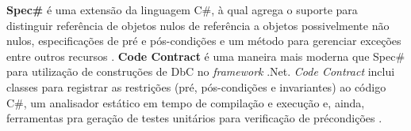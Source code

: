 \textbf{Spec\#} é uma extensão da linguagem C\#, à qual agrega o suporte para
distinguir referência de objetos nulos de referência a objetos possivelmente não
nulos, especificações de pré e pós-condições e um método para gerenciar
exceções entre outros recursos \cite{barnett2004spec}. \textbf{Code Contract} é
uma maneira mais moderna que Spec\# para utilização de construções de DbC no 
\textit{framework} .Net. \textit{Code Contract} inclui classes para registrar as
restrições (pré, pós-condições e invariantes) ao código C\#, um analisador
estático em tempo de compilação e execução e, ainda, ferramentas pra
geração de testes unitários para verificação de précondições 
\cite{codecontractSite}.